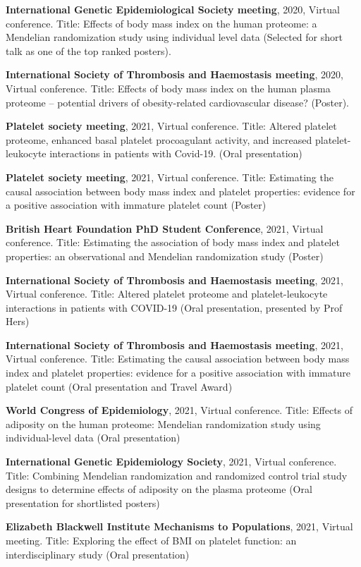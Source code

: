 \documentclass[11pt,twoside]{bristolthesis}
\begin{document}
\textbf{International Genetic Epidemiological Society meeting}, 2020, Virtual conference. Title: Effects of body mass index on the human proteome: a Mendelian randomization study using individual level data (Selected for short talk as one of the top ranked posters).

\textbf{International Society of Thrombosis and Haemostasis meeting}, 2020, Virtual conference. Title: Effects of body mass index on the human plasma proteome -- potential drivers of obesity-related cardiovascular disease? (Poster).

\textbf{Platelet society meeting}, 2021, Virtual conference. Title: Altered platelet proteome, enhanced basal platelet procoagulant activity, and increased platelet-leukocyte interactions in patients with Covid-19. (Oral presentation)

\textbf{Platelet society meeting}, 2021, Virtual conference. Title: Estimating the causal association between body mass index and platelet properties: evidence for a positive association with immature platelet count (Poster)

\textbf{British Heart Foundation PhD Student Conference}, 2021, Virtual conference. Title: Estimating the association of body mass index and platelet properties: an observational and Mendelian randomization study (Poster)

\textbf{International Society of Thrombosis and Haemostasis meeting}, 2021, Virtual conference. Title: Altered platelet proteome and platelet-leukocyte interactions in patients with COVID-19 (Oral presentation, presented by Prof Hers)

\textbf{International Society of Thrombosis and Haemostasis meeting}, 2021, Virtual conference. Title: Estimating the causal association between body mass index and platelet properties: evidence for a positive association with immature platelet count (Oral presentation and Travel Award)

\textbf{World Congress of Epidemiology}, 2021, Virtual conference. Title: Effects of adiposity on the human proteome: Mendelian randomization study using individual-level data (Oral presentation)

\textbf{International Genetic Epidemiology Society}, 2021, Virtual conference. Title: Combining Mendelian randomization and randomized control trial study designs to determine effects of adiposity on the plasma proteome (Oral presentation for shortlisted posters)

\textbf{Elizabeth Blackwell Institute Mechanisms to Populations}, 2021, Virtual meeting. Title: Exploring the effect of BMI on platelet function: an interdisciplinary study (Oral presentation)
\end{document}
